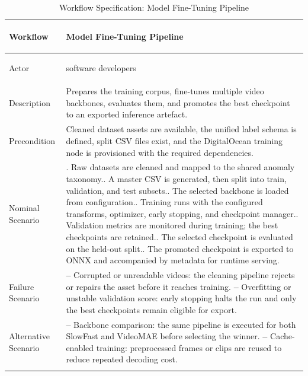 \documentclass[12pt,a4paper,oneside]{report}
\newlength{\TblTwoKeyW}
\newlength{\TblTwoValW}
\begin{document}
{\small
\begin{longtable}{|>{\bfseries\raggedright\arraybackslash}p{\TblTwoKeyW}|>{\raggedright\arraybackslash}p{\TblTwoValW}|}
\hline
Workflow    & Model Fine-Tuning Pipeline \\ \hline
Actor       & software developers \\ \hline
Description & Prepares the training corpus, fine-tunes multiple video backbones, evaluates them, and promotes the best checkpoint to an exported inference artefact. \\ \hline
Precondition & Cleaned dataset assets are available, the unified label schema is defined, split CSV files exist, and the DigitalOcean training node is provisioned with the required dependencies. \\ \hline
Nominal Scenario &
1. Raw datasets are cleaned and mapped to the shared anomaly taxonomy.\newline
2. A master CSV is generated, then split into train, validation, and test subsets.\newline
3. The selected backbone is loaded from configuration.\newline
4. Training runs with the configured transforms, optimizer, early stopping, and checkpoint manager.\newline
5. Validation metrics are monitored during training; the best checkpoints are retained.\newline
6. The selected checkpoint is evaluated on the held-out split.\newline
7. The promoted checkpoint is exported to ONNX and accompanied by metadata for runtime serving. \\ \hline
Failure Scenario &
\textbf{--} Corrupted or unreadable videos: the cleaning pipeline rejects or repairs the asset before it reaches training.\newline
\textbf{--} Overfitting or unstable validation score: early stopping halts the run and only the best checkpoints remain eligible for export. \\ \hline
Alternative Scenario &
\textbf{--} Backbone comparison: the same pipeline is executed for both SlowFast and VideoMAE before selecting the winner.\newline
\textbf{--} Cache-enabled training: preprocessed frames or clips are reused to reduce repeated decoding cost. \\ \hline
\caption{Workflow Specification: Model Fine-Tuning Pipeline}
\label{tab:app_s4_workflow_finetuning}
\end{longtable}
}
\end{document}
